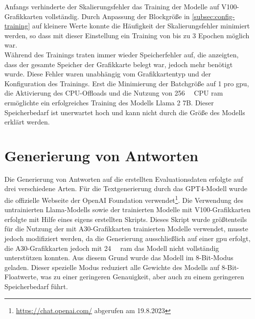 Anfangs verhinderte der Skalierungsfehler das Training der Modelle auf V100-Grafikkarten vollständig.
Durch Anpassung der Blockgröße in \cref{subsec:config-training} auf kleinere Werte konnte die Häufigkeit der Skalierungsfehler minimiert werden, so dass mit dieser Einstellung ein Training von bis zu 3 Epochen möglich war.\\

Während des Trainings traten immer wieder Speicherfehler auf, die anzeigten, dass der gesamte Speicher der Grafikkarte belegt war, jedoch mehr benötigt wurde.
Diese Fehler waren unabhängig vom Grafikkartentyp und der Konfiguration des Trainings.
Erst die Minimierung der Batchgröße auf 1 pro \ac{gpu}, die Aktivierung des CPU-Offloads und die Nutzung von \SI{256}{\giga\byte} CPU \ac{ram} ermöglichte ein erfolgreiches Training des Modells Llama 2 7B.
Dieser Speicherbedarf ist unerwartet hoch und kann nicht durch die Größe des Modells erklärt werden.

\section{Generierung von Antworten}\label{sec:generierung}
Die Generierung von Antworten auf die erstellten Evaluationsdaten erfolgte auf drei verschiedene Arten.
Für die Textgenerierung durch das GPT4-Modell wurde die offizielle Webseite der OpenAI Foundation verwendet\footnote{\url{https://chat.openai.com/} abgerufen am 19.8.2023}.
Die Verwendung des untrainierten Llama-Modells sowie der trainierten Modelle mit V100-Grafikkarten erfolgte mit Hilfe eines eigens erstellten Skripts.
Dieses Skript wurde größtenteils für die Nutzung der mit A30-Grafikkarten trainierten Modelle verwendet, musste jedoch modifiziert werden, da die Generierung ausschließlich auf einer \ac{gpu} erfolgt, die A30-Grafikkarten jedoch mit \SI{24}{\giga\byte} \ac{ram} das Modell nicht vollständig unterstützen konnten.
Aus diesem Grund wurde das Modell im 8-Bit-Modus geladen. Dieser spezielle Modus reduziert alle Gewichte des Modells auf 8-Bit-Floatwerte, was zu einer geringeren Genauigkeit, aber auch zu einem geringeren Speicherbedarf führt.\\

